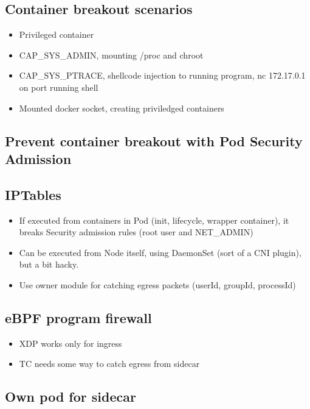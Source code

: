 \documentclass[english,12pt,a4paper,pdftex,sci,utf8]{aaltothesis}
\begin{document}
\subsection{Container breakout scenarios}

\cite{bui2015analysis}

\begin{itemize}
  \item Privileged container
  \item CAP\_SYS\_ADMIN, mounting /proc and chroot
  \item CAP\_SYS\_PTRACE, shellcode injection to running program, nc 172.17.0.1 on port running shell
  \item Mounted docker socket, creating priviledged containers
\end{itemize}

\subsection{Prevent container breakout with Pod Security Admission}

\subsection{IPTables}

\begin{itemize}
  \item If executed from containers in Pod (init, lifecycle, wrapper container), it breaks Security admission rules (root user and NET\_ADMIN)
  \item Can be executed from Node itself, using DaemonSet (sort of a CNI plugin), but a bit hacky.
  \item Use owner module for catching egress packets (userId, groupId, processId)
\end{itemize}

\subsection{eBPF program firewall}

\begin{itemize}
  \item XDP works only for ingress
  \item TC needs some way to catch egress from sidecar
\end{itemize}

\subsection{Own pod for sidecar}
\end{document}

